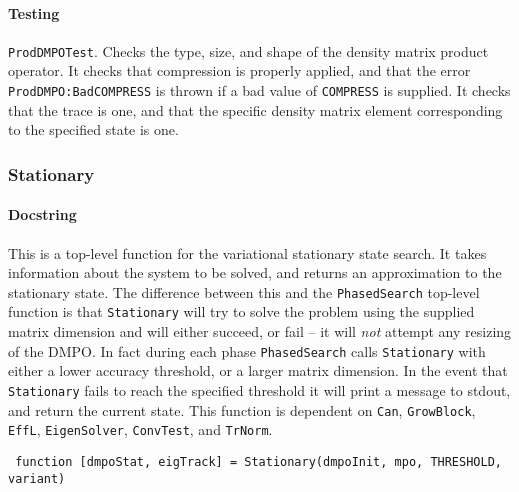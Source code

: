  \paragraph{Testing} \lstinline$ProdDMPOTest$. Checks the type, size, and shape of the density matrix product operator. It checks that compression is properly applied, and that the error \lstinline$ProdDMPO:BadCOMPRESS$ is thrown if a bad value of \lstinline$COMPRESS$ is supplied. It checks that the trace is one, and that the specific density matrix element corresponding to the specified state is one.
 
 \subsubsection{Stationary}
 \paragraph{Docstring} This is a top-level function for the variational stationary state search. It takes information about the system to be solved, and returns an approximation to the stationary state. The difference between this and the \lstinline$PhasedSearch$ top-level function is that \lstinline$Stationary$ will try to solve the problem using the supplied matrix dimension and will either succeed, or fail -- it will \emph{not} attempt any resizing of the DMPO. In fact during each phase \lstinline$PhasedSearch$ calls \lstinline$Stationary$ with either a lower accuracy threshold, or a larger matrix dimension. In the event that \lstinline$Stationary$ fails to reach the specified threshold it will print a message to stdout, and return the current state. This function is dependent on \lstinline$Can$, \lstinline$GrowBlock$, \lstinline$EffL$, \lstinline$EigenSolver$, \lstinline$ConvTest$, and \lstinline$TrNorm$.
 \begin{lstlisting}
 function [dmpoStat, eigTrack] = Stationary(dmpoInit, mpo, THRESHOLD, variant) \end{lstlisting}
